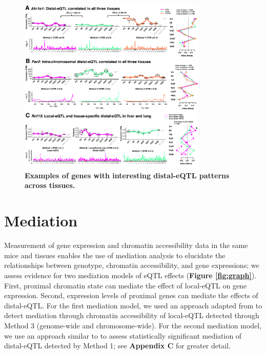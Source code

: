 \begin{figure}[h]
\renewcommand{\familydefault}{\sfdefault}\normalfont
\centering
\includegraphics[width=0.8\textwidth, trim={0in 0in 0in 0in}, clip]{figs/correlated_distal_eqtl.pdf}
\caption{\textbf{Examples of genes with interesting distal-eQTL patterns across tissues.}\label{fig:correlated_distal_eqtl}}
\end{figure}


\section{Mediation}

Measurement of gene expression and chromatin accessibility data in the same mice and tissues enables the use of mediation analysis to elucidate the relationships between genotype, chromatin accessibility, and gene expressions; we assess evidence for two mediation models of eQTL effects (\textbf{Figure \ref{fig:graph}}). First, proximal chromatin state can mediate the effect of local-eQTL on gene expression. Second, expression levels of proximal genes can mediate the effects of distal-eQTL. For the first mediation model, we used an approach adapted from \cite{Chick2016} to detect mediation through chromatin accessibility of local-eQTL detected through Method 3 (genome-wide and chromosome-wide). For the second mediation model, we use an approach similar to \cite{Keller2018} to assess statistically significant mediation of distal-eQTL detected by Method 1; see \textbf{Appendix C} for greater detail.  

